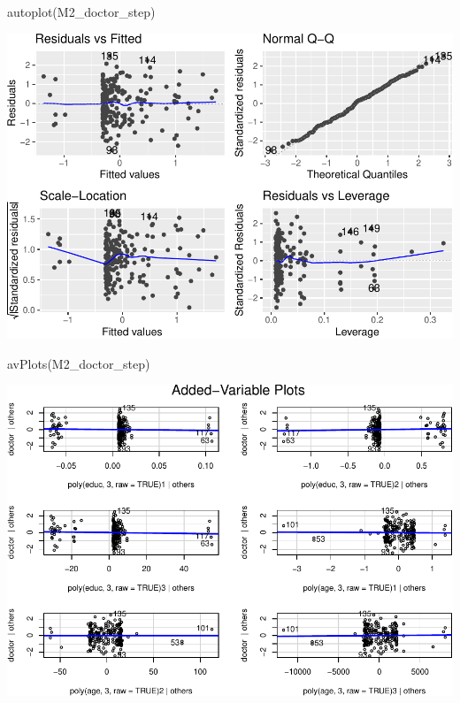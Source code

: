 \documentclass[
]{article}
\newenvironment{Shaded}{\begin{snugshade}}{\end{snugshade}}
\newcommand{\FunctionTok}[1]{\textcolor[rgb]{0.00,0.00,0.00}{#1}}
\newcommand{\NormalTok}[1]{#1}
\begin{document}
\begin{Shaded}
\begin{Highlighting}[]
\FunctionTok{autoplot}\NormalTok{(M2\_doctor\_step)}
\end{Highlighting}
\end{Shaded}

\includegraphics{HW5-Trinath-Sai-Subhash-Reddy-Pittala_files/figure-latex/unnamed-chunk-21-1.pdf}

\begin{Shaded}
\begin{Highlighting}[]
\FunctionTok{avPlots}\NormalTok{(M2\_doctor\_step)}
\end{Highlighting}
\end{Shaded}

\includegraphics{HW5-Trinath-Sai-Subhash-Reddy-Pittala_files/figure-latex/unnamed-chunk-21-2.pdf}
\end{document}
